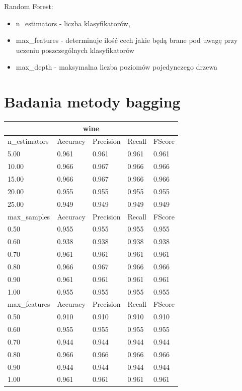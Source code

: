 \documentclass[12pt,a4paper]{article}
\begin{document}
Random Forest:
\begin{itemize}
  \item n\_estimators  - liczba klasyfikatorów,
  \item max\_features  - determinuje ilość cech jakie będą brane pod uwagę przy uczeniu poszczególnych klasyfikatorów
  \item max\_depth  - maksymalna liczba poziomów pojedynczego drzewa
\end{itemize}

\section{Badania metody bagging}
\begin{tabular}{ |p{3cm}||p{2cm}|p{2cm}|p{2cm}|p{2cm}| }
\hline
\multicolumn{5}{|c|}{wine}\\
\hline
n\_estimators & Accuracy & Precision & Recall & FScore \\
\hline
5.00 & 0.961 & 0.961 & 0.961 & 0.961\\
10.00 & 0.966 & 0.967 & 0.966 & 0.966\\
15.00 & 0.966 & 0.967 & 0.966 & 0.966\\
20.00 & 0.955 & 0.955 & 0.955 & 0.955\\
25.00 & 0.949 & 0.949 & 0.949 & 0.949\\
\hline
max\_samples & Accuracy & Precision & Recall & FScore \\
\hline
0.50 & 0.955 & 0.955 & 0.955 & 0.955\\
0.60 & 0.938 & 0.938 & 0.938 & 0.938\\
0.70 & 0.961 & 0.961 & 0.961 & 0.961\\
0.80 & 0.966 & 0.967 & 0.966 & 0.966\\
0.90 & 0.961 & 0.961 & 0.961 & 0.961\\
1.00 & 0.955 & 0.955 & 0.955 & 0.955\\
\hline
max\_features & Accuracy & Precision & Recall & FScore \\
\hline
0.50 & 0.910 & 0.910 & 0.910 & 0.910\\
0.60 & 0.955 & 0.955 & 0.955 & 0.955\\
0.70 & 0.944 & 0.944 & 0.944 & 0.944\\
0.80 & 0.966 & 0.966 & 0.966 & 0.966\\
0.90 & 0.944 & 0.944 & 0.944 & 0.944\\
1.00 & 0.961 & 0.961 & 0.961 & 0.961\\
\hline
\end{tabular}
\end{document}

